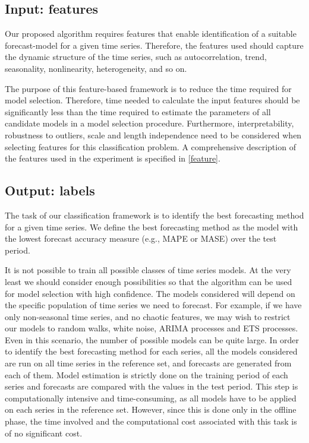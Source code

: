 \documentclass[11pt,a4paper,]{article}
\theoremstyle{definition}
\theoremstyle{definition}
\theoremstyle{definition}
\theoremstyle{remark}
\begin{document}
\subsection{Input: features}\label{input-features}

Our proposed algorithm requires features that enable identification of a
suitable forecast-model for a given time series. Therefore, the features
used should capture the dynamic structure of the time series, such as
autocorrelation, trend, seasonality, nonlinearity, heterogeneity, and so
on.

The purpose of this feature-based framework is to reduce the time
required for model selection. Therefore, time needed to calculate the
input features should be significantly less than the time required to
estimate the parameters of all candidate models in a model selection
procedure. Furthermore, interpretability, robustness to outliers, scale
and length independence need to be considered when selecting features
for this classification problem. A comprehensive description of the
features used in the experiment is specified in \autoref{feature}.

\subsection{Output: labels}\label{output-labels}

The task of our classification framework is to identify the best
forecasting method for a given time series. We define the best
forecasting method as the model with the lowest forecast accuracy
measure (e.g., MAPE or MASE) over the test period.

It is not possible to train all possible classes of time series models.
At the very least we should consider enough possibilities so that the
algorithm can be used for model selection with high confidence. The
models considered will depend on the specific population of time series
we need to forecast. For example, if we have only non-seasonal time
series, and no chaotic features, we may wish to restrict our models to
random walks, white noise, ARIMA processes and ETS processes. Even in
this scenario, the number of possible models can be quite large. In
order to identify the best forecasting method for each series, all the
models considered are run on all time series in the reference set, and
forecasts are generated from each of them. Model estimation is strictly
done on the training period of each series and forecasts are compared
with the values in the test period. This step is computationally
intensive and time-consuming, as all models have to be applied on each
series in the reference set. However, since this is done only in the
offline phase, the time involved and the computational cost associated
with this task is of no significant cost.
\end{document}
